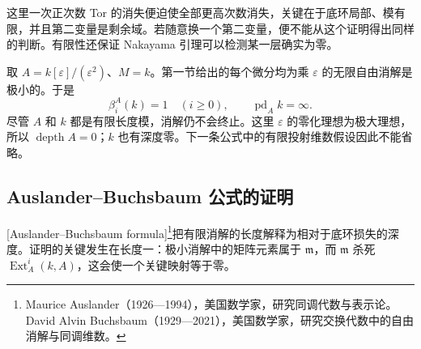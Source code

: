 这里一次正次数 Tor 的消失便迫使全部更高次数消失，关键在于底环局部、模有限，并且第二变量是剩余域。若随意换一个第二变量，便不能从这个证明得出同样的判断。有限性还保证 Nakayama 引理可以检测某一层确实为零。

\begin{example}\label{g5:exm:dual-number-infinite-pd}
	取 \(A=k[\varepsilon]/(\varepsilon^2)\)、\(M=k\)。第一节给出的每个微分均为乘 \(\varepsilon\) 的无限自由消解是极小的。于是
	\[
		\beta_i^A(k)=1\quad(i\geq0),\qquad
		\operatorname{pd}_A k=\infty.
	\]
	尽管 \(A\) 和 \(k\) 都是有限长度模，消解仍不会终止。这里 \(\varepsilon\) 的零化理想为极大理想，所以 \(\operatorname{depth}A=0\)；\(k\) 也有深度零。下一条公式中的有限投射维数假设因此不能省略。
\end{example}

\subsection{Auslander–Buchsbaum 公式的证明}
\label{g5:subsec:0804:04}

[Auslander--Buchsbaum formula]\footnote{Maurice Auslander（1926—1994），美国数学家，研究同调代数与表示论。David Alvin Buchsbaum（1929—2021），美国数学家，研究交换代数中的自由消解与同调维数。}把有限消解的长度解释为相对于底环损失的深度。证明的关键发生在长度一：极小消解中的矩阵元素属于 \(\mathfrak m\)，而 \(\mathfrak m\) 杀死 \(\operatorname{Ext}_A^i(k,A)\)，这会使一个关键映射等于零。

